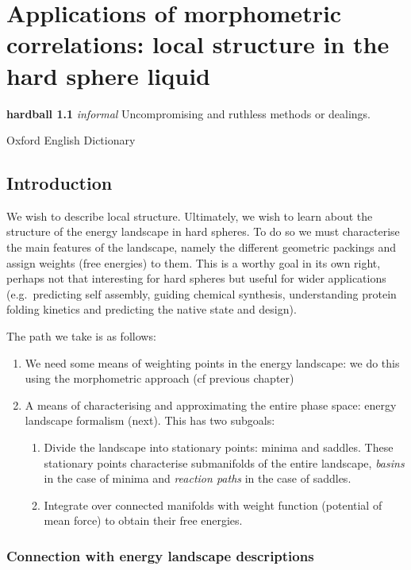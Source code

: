 \documentclass[11pt,twoside]{report}
\begin{document}
\chapter{Applications of morphometric correlations: local structure in the hard sphere liquid}
\epigraph{\textbf{hardball 1.1} \emph{informal} Uncompromising and ruthless methods or dealings.}{Oxford English Dictionary}
\label{chapter:morphometric-applications}

\section{Introduction}

We wish to describe local structure.
Ultimately, we wish to learn about the structure of the energy landscape in hard spheres.
To do so we must characterise the main features of the landscape, namely the different geometric packings and assign weights (free energies) to them.
This is a worthy goal in its own right, perhaps not that interesting for hard spheres but useful for wider applications (e.g.\ predicting self assembly, guiding chemical synthesis, understanding protein folding kinetics and predicting the native state and design).

The path we take is as follows:
\begin{enumerate}
\item We need some means of weighting points in the energy landscape: we do this using the morphometric approach (cf previous chapter)
\item A means of characterising and approximating the entire phase space: energy landscape formalism (next). This has two subgoals:
  \begin{enumerate}
  \item Divide the landscape into stationary points: minima and saddles.
    These stationary points characterise submanifolds of the entire landscape, \emph{basins} in the case of minima and \emph{reaction paths} in the case of saddles.
  \item Integrate over connected manifolds with weight function (potential of mean force) to obtain their free energies.
  \end{enumerate}
\end{enumerate}


\subsection{Connection with energy landscape descriptions}
\end{document}
